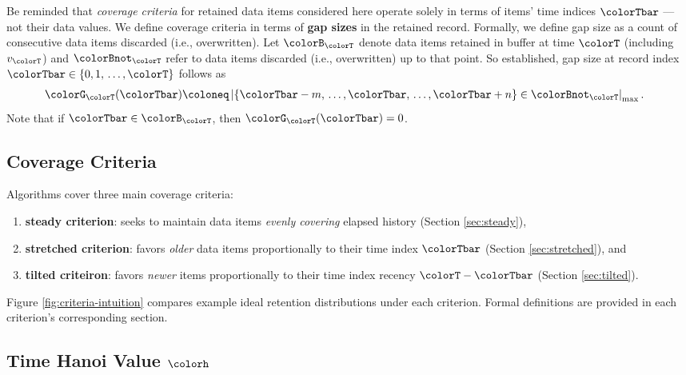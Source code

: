 Be reminded that \textit{coverage criteria} for retained data items considered here operate solely in terms of items' time indices $\colorTbar$ --- not their data values.
We define coverage criteria in terms of \textbf{gap sizes} in the retained record.
Formally, we define gap size as a count of consecutive data items discarded (i.e., overwritten).
Let $\colorB_{\colorT}$ denote data items retained in buffer at time $\colorT$ (including $v_{\colorT}$) and $\colorBnot_{\colorT}$ refer to data items discarded (i.e., overwritten) up to that point.
So established, gap size at record index $\colorTbar \in \{0,1,\,\ldots,\colorT\}$ follows as
\begin{align}
\colorG_{\colorT}(\colorTbar)
&\coloneq
\left| \{\colorTbar - m, \,\ldots, \colorTbar, \,\ldots, \colorTbar+n\} \in \colorBnot_{\colorT} \right|_\mathrm{max}.
\label{eqn:gap-size-defn}
\end{align}
Note that if $\colorTbar \in \colorB_{\colorT}$, then $\colorG_{\colorT}(\colorTbar) = 0$.

\subsection{Coverage Criteria}
\label{sec:notation-coverage}

Algorithms cover three main coverage criteria:
\begin{enumerate}
\item \textbf{steady criterion}: seeks to maintain data items \textit{evenly covering} elapsed history (Section \ref{sec:steady}),
\item \textbf{stretched criterion}: favors \textit{older} data items proportionally to their time index $\colorTbar$ (Section \ref{sec:stretched}), and
\item \textbf{tilted criteiron}: favors \textit{newer} items proportionally to their time index recency $\colorT - \colorTbar$ (Section \ref{sec:tilted}).
\end{enumerate}
Figure \ref{fig:criteria-intuition} compares example ideal retention distributions under each criterion.
Formal definitions are provided in each criterion's corresponding section.

\subsection{Time Hanoi Value $\colorh$}
\label{sec:notation-hanoi}



